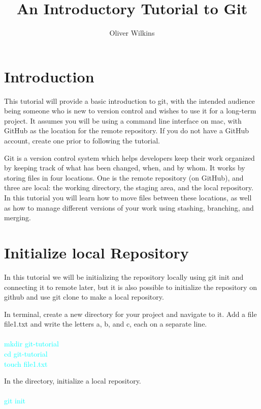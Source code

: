 \documentclass[10pt,twocolumn]{article}
\title{An Introductory Tutorial to Git}
\author{Oliver Wilkins}
\affiliation{Occidental College}
\begin{document}
\maketitle

\section{Introduction}

This tutorial will provide a basic introduction to git, with the intended audience being someone who is new to version control and wishes to use it for a long-term project. It assumes you will be using a command line interface on mac, with GitHub as the location for the remote repository. If you do not have a GitHub account, create one prior to following the tutorial. 

Git is a version control system which helps developers keep their work organized by keeping track of what has been changed, when, and by whom.  It works by storing files in four locations. One is the remote repository (on GitHub), and three are local: the working directory, the staging area, and the local repository. In this tutorial you will learn how to move files between these locations, as well as how to manage different versions of your work using stashing, branching, and merging.


\section{Initialize local Repository}

In this tutorial we will be initializing the repository locally using git init and connecting it to remote later, but it is also possible to initialize the repository on github and use git clone to make a local repository. 

In terminal, create a new directory for your project and navigate to it. Add a file file1.txt and write the letters a, b, and c, each on a separate line.\\\\
\textcolor{cyan}{
mkdir git-tutorial\\
cd git-tutorial\\
touch file1.txt\\
}

In the directory, initialize a local repository.\\\\
\textcolor{cyan}{
git init\\
}
\end{document}
